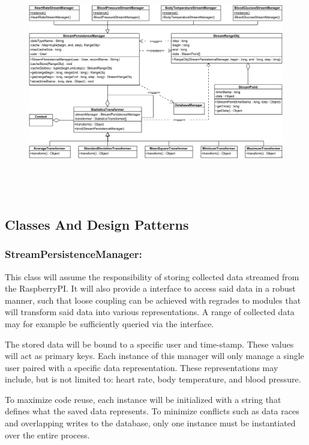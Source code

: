 \begin{center}
\begin{figure}[h]
	\includegraphics[width=15cm, height=10cm]{StatisticsSubsystem/statisticsClassDiagram.png}
\end{figure}
\end{center}
\subsection*{\textbf{Classes And Design Patterns}}

\subsubsection*{\textbf{StreamPersistenceManager:}}
This class will assume the responsibility of storing collected data streamed from the RaspberryPI. It will also provide a interface to access said data in a robust manner, such that loose coupling can be achieved with regrades to modules that will transform said data into various representations. A range of collected data may for example be sufficiently queried via the interface.

The stored data will be bound to a specific user and time-stamp. These values will act as primary keys. Each instance of this manager will only manage a single user paired with a specific data representation. These representations may include, but is not limited to: heart rate, body temperature, and blood pressure.

To maximize code reuse, each instance will be initialized with a string that defines what the saved data represents. To minimize conflicts such as data races and overlapping writes to the database, only one instance must be instantiated over the entire process.


